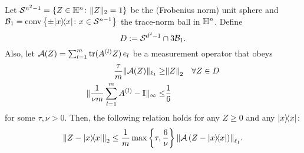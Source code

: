 \begin{proposition}%
  \label{prop:nsp_implication}
  Let $\mathcal{S}^{n^2-1}=\left\{  Z \in \mathbb{H}^n\colon \|  Z \|_2=1 \right\}$ be the (Frobenius norm) unit sphere and $\mathcal{B}_1 = \mathrm{conv} \left\{ \pm | x \rangle \! \langle  x| \colon  x \in \mathcal{S}^{n-1} \right\}$ the trace-norm ball in $\mathbb{H}^n$.
  Define
  \[
    D := \mathcal{S}^{d^2-1} \cap 3 \mathcal{B}_1.
    \label{eq:pl.D}
  \]
  Also, let $\mathcal{A}(Z) = \sum_{l=1}^m \operatorname{tr} ( A^{(l)}  Z ) \,  {e_l}$ be a measurement operator that obeys
  \begin{align}
      \frac{ \tau}{m} \| \mathcal{A}( Z) \|_{\ell_1} \geq& {\Vert Z\Vert}_2 \quad \forall  Z \in D \label{eq:pl.nsp}\\
      \| \frac{1}{\nu m}\sum_{l=1}^m  A^{(l)} -  \mathbb{I} \|_\infty \leq& \frac{1}{6}\label{eq:pl.approx_povm}
  \end{align}
  for some $\tau,\nu >0$.
  Then, the following relation holds for any $ Z \geq 0$ and any $\ketbra x$:
  \[
    \label{eq:pl.rec_guarantee}
    \Fnorm{Z - \ketbra{x}}
    \leq \frac{1}{m} \max \left\{ \tau, \frac{6}{\nu} \right\}  \Norm{\mathcal{A}\left( Z - \ketbra{x} \right)}_{\ell_1}.
  \]
\end{proposition}


